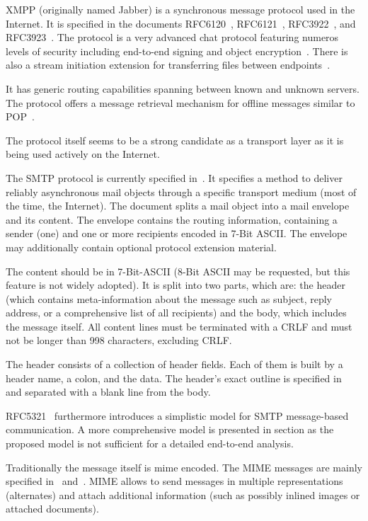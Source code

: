 XMPP (originally named Jabber) is a synchronous message protocol used in the Internet. It is specified in the documents RFC6120~\cite{rfc6120}, RFC6121~\cite{rfc6121}, RFC3922~\cite{rfc3922}, and RFC3923~\cite{rfc3923}. The protocol is a very advanced chat protocol featuring numeros levels of security including end-to-end signing and object encryption~\cite{rfc3923}. There is also a stream initiation extension for transferring files between endpoints~\cite{xep0096}.

It has generic routing capabilities spanning between known and unknown servers. The protocol offers a message retrieval mechanism for offline messages similar to POP~\cite{xep0013}.

The protocol itself seems to be a strong candidate as a transport layer as it is being used actively on the Internet.

The SMTP protocol is currently specified in~\cite{rfc5321}. It specifies a method to deliver reliably asynchronous mail objects through a specific transport medium (most of the time, the Internet). The document splits a mail object into a mail envelope and its content. The envelope contains the routing information, containing a sender (one) and one or more recipients encoded in 7-Bit ASCII. The envelope may additionally contain optional protocol extension material. 

The content should be in 7-Bit-ASCII (8-Bit ASCII may be requested, but this feature is not widely adopted). It is split into two parts, which are: the header (which contains meta-information about the message such as subject, reply address, or a comprehensive list of all recipients) and the body, which includes the message itself. All content lines must be terminated with a CRLF and must not be longer than 998 characters, excluding CRLF.

The header consists of a collection of header fields. Each of them is built by a header name, a colon, and the data. The header's exact outline is specified in~\cite{rfc5322} and separated with a blank line from the body. 

RFC5321~\cite{rfc5321} furthermore introduces a simplistic model for SMTP message-based communication. A more comprehensive model is presented in section  as the proposed model is not sufficient for a detailed end-to-end analysis.

Traditionally the message itself is mime encoded. The MIME messages are mainly specified in~\cite{rfc2045} and~\cite{rfc2046}. MIME allows to send messages in multiple representations (alternates) and attach additional information (such as possibly inlined images or attached documents). 

